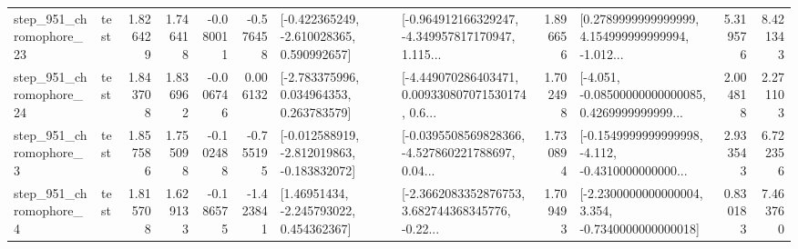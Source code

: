 \begin{tabular}{llrrrrllrlrr}
  step\_951\_chromophore\_23 &      test &      1.826429 &    1.746418 &     -0.080011 & -0.576458 &   [-0.422365249, -2.610028365, 0.590992657] &  [-0.964912166329247, -4.349957817170947, 1.115... &       1.896656 &  [0.2789999999999999, 4.154999999999994, -1.012... &            5.319576 &          8.421343 \\
  step\_951\_chromophore\_24 &      test &      1.843708 &    1.836962 &     -0.006746 &  0.006132 &    [-2.783375996, 0.034964353, 0.263783579] &  [-4.449070286403471, 0.009330807071530174, 0.6... &       1.702498 &  [-4.051, -0.08500000000000085, 0.4269999999999... &            2.004818 &          2.271103 \\
   step\_951\_chromophore\_3 &      test &      1.857586 &    1.755098 &     -0.102488 & -0.755195 &  [-0.012588919, -2.812019863, -0.183832072] &  [-0.0395508569828366, -4.527860221788697, 0.04... &       1.730894 &  [-0.1549999999999998, -4.112, -0.4310000000000... &            2.933543 &          6.722356 \\
   step\_951\_chromophore\_4 &      test &      1.815708 &    1.629133 &     -0.186575 & -1.423841 &     [1.46951434, -2.245793022, 0.454362367] &  [-2.3662083352876753, 3.682744368345776, -0.22... &       1.709493 &  [-2.2300000000000004, 3.354, -0.7340000000000018] &            0.830183 &          7.463760 \\
\bottomrule
\end{tabular}

